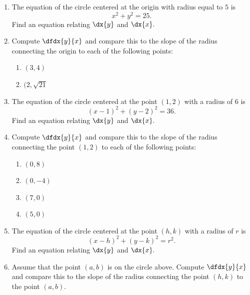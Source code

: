 \begin{ProblemSection}
\begin{embeddedproblem}{}
  \begin{enumerate}[label={\bf{}(\alph*)}]
  \item  The equation of the circle centered at the origin with radius
    equal to $5$ is  $$x^2+y^2=25.$$ Find an equation relating
    $\dx{y}$ and $\dx{x}.$
  \item Compute $\dfdx{y}{x}$ and compare this to the slope of the
    radius connecting the origin to each of the following points:
    \begin{enumerate}[label={\bf{}(\roman*)}]    
    \item  $(3,4)$ 
    \item $(2, \sqrt{21}$
    \end{enumerate}
  \item The equation of the circle centered at the point $(1,2)$ with
    a radius of $6$ is $$(x-1)^2+(y-2)^2=36.$$ Find an equation relating
    $\dx{y}$ and $\dx{x}.$
  \item Compute $\dfdx{y}{x}$ and compare this to the slope of the
    radius connecting the point $(1,2)$ to each of the following points:
    \begin{enumerate}[label={\bf{}(\roman*)}]    
    \item $(0,8)$
    \item $(0,-4)$
    \item $(7,0)$
    \item $(5,0)$
    \end{enumerate}
  \item The equation of the circle centered at the point $(h,k)$ with
    a radius of $r$ is $$(x-h)^2+(y-k)^2=r^2.$$ Find an equation relating
    $\dx{y}$ and $\dx{x}.$
  \item Assume that the point $(a,b)$ is on the circle above. Compute $\dfdx{y}{x}$ and compare this to the slope of the
    radius connecting the point $(h,k)$ to the point $(a,b).$
  \end{enumerate}
\end{embeddedproblem}
  \end{ProblemSection}

  
\begin{ProblemSection}

\end{ProblemSection}


\begin{ProblemSection}
\end{ProblemSection}

